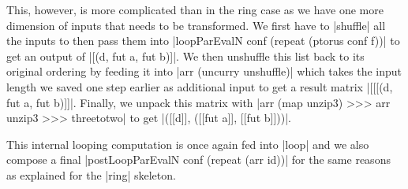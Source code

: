 This, however, is more complicated than in the ring case as we have one more dimension of inputs that needs to be transformed. We first have to |shuffle| all the inputs to then pass them into |loopParEvalN conf (repeat (ptorus conf f))| to get an output of |[(d, fut a, fut b)]|. We then unshuffle this list back to its original ordering by feeding it into |arr (uncurry unshuffle)| which takes the input length we saved one step earlier as additional input to get a result matrix |[[[(d, fut a, fut b)]]|. Finally, we unpack this matrix  with |arr (map unzip3) >>> arr unzip3 >>> threetotwo| to get |([[d]], ([[fut a]], [[fut b]]))|.

This internal looping computation is once again fed into |loop| and we also compose a final |postLoopParEvalN conf (repeat (arr id))| for the same reasons as explained for the |ring| skeleton. 

